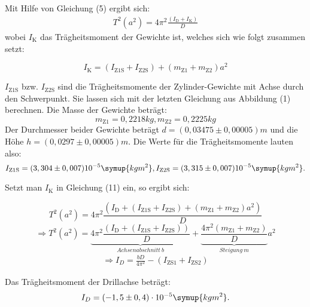 Mit Hilfe von Gleichung (5) ergibt sich:
\begin{align}
  T^2(a^2) = 4\pi^2\frac{(I_\text{D}+I_\text{K})}{D}
\end{align}
wobei $I_\text{K}$ das Trägheitsmoment der Gewichte ist, welches sich wie folgt zusammen setzt:

\begin{equation}
 I_\text{K} = (I_\text{Z1S}+I_\text{Z2S})+(m_\text{Z1}+m_\text{Z2})a^2
\end{equation}

$I_\text{Z1S}$ bzw. $I_\text{Z2S}$ sind die Trägheitsmomente der Zylinder-Gewichte mit Achse durch den Schwerpunkt.
Sie lassen sich mit der letzten Gleichung aus Abbildung (1) berechnen.
Die Masse der Gewichte beträgt:
\begin{equation}
m_\text{Z1} = 0,2218 kg , m_\text{Z2} = 0,2225 kg
\end{equation}
Der Durchmesser beider Gewichte beträgt $d = (0,03475 \pm 0,00005)m$ und die Höhe $h = (0,0297 \pm 0,00005)m$.
Die Werte für die Trägheitsmomente lauten also:
\begin{equation}
I_\text{Z1S} = (3,304 \pm 0,007)10^{-5} \symup{kgm^2}  , I_\text{Z2S} = (3,315 \pm 0,007)10^{-5} \symup{kgm^2} .
\end{equation}

Setzt man $I_\text{K}$ in Gleichung (11) ein, so ergibt sich:

\begin{equation}
 T^2(a^2) = 4\pi^2\frac{(I_\text{D}+(I_\text{Z1S}+I_\text{Z2S})+(m_\text{Z1}+m_\text{Z2})a^2)}{D}
\end{equation}
\begin{equation}
 \Rightarrow T^2(a^2) = \underbrace{4\pi^2\frac{(I_\text{D}+(I_\text{Z1S}+I_\text{Z2S}))}{D}}_{Achsenabschnitt \: b} + \underbrace{\frac{4\pi^2(m_\text{Z1}+m_\text{Z2})}{D}}_{Steigung \: m} a^2
 \end{equation}
 \begin{align}
  \Rightarrow I_D = \frac{bD}{4\pi^2}-(I_\text{ZS1}+I_\text{ZS2})
 \end{align}

 Das Trägheitsmoment der Drillachse beträgt:
 \begin{equation}
 I_D= (-1,5 \pm 0,4) \cdot 10^{-5} \symup{kgm^2} .
 \end{equation}


